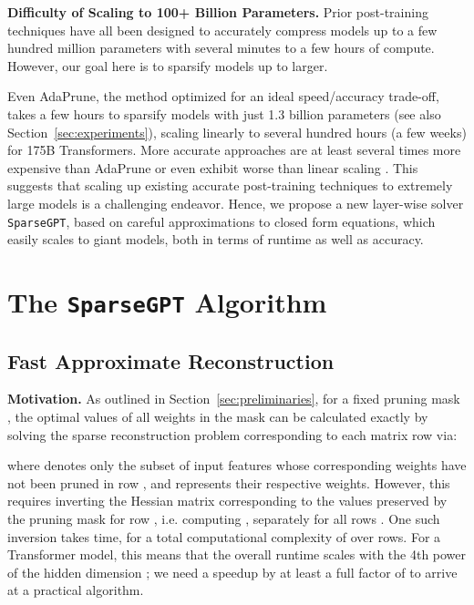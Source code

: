 \documentclass{article}
\theoremstyle{plain}
\theoremstyle{definition}
\theoremstyle{remark}
\renewcommand{\paragraph}[1]{\vspace{-0.1em} \noindent \textbf{#1}}
\newcommand{\sparsegpt}[1]{\texttt{SparseGPT}}
\begin{document}
\paragraph{Difficulty of Scaling to 100+ Billion Parameters.} Prior post-training techniques have all been designed to accurately compress models up to a few hundred million parameters with several minutes to a few hours of compute. However, our goal here  is to sparsify models up to  larger.

Even AdaPrune, the method optimized for an ideal speed/accuracy trade-off, takes a few hours to sparsify models with just 1.3 billion parameters (see also Section~\ref{sec:experiments}), scaling linearly to several hundred hours (a few weeks) for 175B Transformers. More accurate approaches are at least several times more expensive \cite{frantar2022spdy} than AdaPrune or even exhibit worse than linear scaling \cite{frantar2022obc}. This suggests that scaling up existing accurate post-training techniques to extremely large models is a challenging endeavor. Hence, we propose a new layer-wise solver \sparsegpt{}, based on careful approximations to closed form equations, which easily scales to giant models, both in terms of runtime as well as accuracy.

\section{The \sparsegpt{} Algorithm}

\subsection{Fast Approximate Reconstruction}
\label{sec:fast-approximate-reconstruction}

\paragraph{Motivation.} As outlined in Section~\ref{sec:preliminaries}, for a fixed pruning mask , the optimal values of all weights in the mask can be calculated exactly by solving the sparse reconstruction problem corresponding to each matrix row  via:

where  denotes only the subset of input features whose corresponding weights have not been pruned in row , and  represents their respective weights. However, this requires inverting the Hessian matrix  corresponding to the values preserved by the pruning mask  for row , i.e. computing , separately for all rows . One such inversion takes  time, for a total computational complexity of  over   rows. For a Transformer model, this means that the overall runtime scales with the 4th power of the hidden dimension ; we need a speedup by at least a full factor of  to arrive at a practical algorithm.
\end{document}
